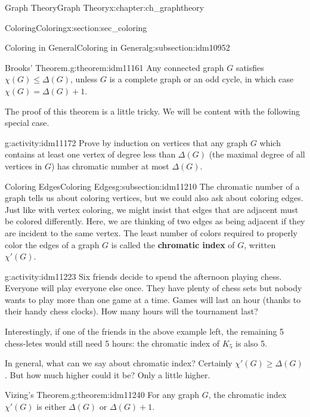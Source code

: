\documentclass[oneside,10pt,]{book}
\newcommand{\terminology}[1]{\textbf{#1}}
\numberwithin{equation}{chapter}
\begin{document}
\begin{chapterptx}{Graph Theory}{}{Graph Theory}{}{}{x:chapter:ch_graphtheory}
\begin{sectionptx}{Coloring}{}{Coloring}{}{}{x:section:sec_coloring}
\begin{subsectionptx}{Coloring in General}{}{Coloring in General}{}{}{g:subsection:idm10952}
\begin{theorem}{Brooks' Theorem.}{}{g:theorem:idm11161}%
 Any connected graph \(G\) satisfies \(\chi(G) \le \Delta(G)\), unless \(G\) is a complete graph or an odd cycle, in which case \(\chi(G) = \Delta(G) + 1\).%
\end{theorem}
The proof of this theorem is a little tricky.  We will be content with the following special case.%
\begin{activity}{}{g:activity:idm11172}%
Prove by induction on vertices that any graph \(G\) which contains at least one vertex of degree less than \(\Delta(G)\) (the maximal degree of all vertices in \(G\)) has chromatic number at most \(\Delta(G)\).%
\end{activity}
\end{subsectionptx}
%
%
\typeout{************************************************}
\typeout{************************************************}
%
\begin{subsectionptx}{Coloring Edges}{}{Coloring Edges}{}{}{g:subsection:idm11210}
The chromatic number of a graph tells us about coloring vertices, but we could also ask about coloring edges. Just like with vertex coloring, we might insist that edges that are adjacent must be colored differently. Here, we are thinking of two edges as being adjacent if they are incident to the same vertex. The least number of colors required to properly color the edges of a graph \(G\) is called the \terminology{chromatic index} of \(G\), written \(\chi'(G)\)\label{g:notation:idm11219}.%
\begin{activity}{}{g:activity:idm11223}%
Six friends decide to spend the afternoon playing chess. Everyone will play everyone else once. They have plenty of chess sets but nobody wants to play more than one game at a time. Games will last an hour (thanks to their handy chess clocks). How many hours will the tournament last?%
\end{activity}
Interestingly, if one of the friends in the above example left, the remaining 5 chess-letes would still need 5 hours: the chromatic index of \(K_5\) is also 5.%
\par
In general, what can we say about chromatic index? Certainly \(\chi'(G) \ge \Delta(G)\). But how much higher could it be? Only a little higher.%
\begin{theorem}{Vizing's Theorem.}{}{g:theorem:idm11240}%
 For any graph \(G\), the chromatic index \(\chi'(G)\) is either \(\Delta(G)\) or \(\Delta(G) + 1\).%

\end{theorem}
\end{subsectionptx}
\end{sectionptx}
\end{chapterptx}
\end{document}
